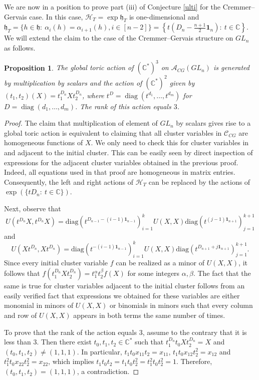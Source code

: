 \documentclass{amsart}
\newtheorem{proposition}[theorem]{Proposition}
\theoremstyle{definition}
\theoremstyle{remark}
\numberwithin{equation}{section}
\numberwithin{theorem}{section}
\begin{document}
 We are now in a position to prove part (iii) of Conjecture \ref{ulti} for the 
Cremmer--Gervais
case. In this case, ${\mathcal H}_T=\exp {\mathfrak h}_T$ is one-dimensional and ${\mathfrak h}_T=\{ h\in{\mathfrak h} {{:\ }} 
\alpha_i(h)=\alpha_{i+1}(h), i\in [n-2]\}=
\left \{ t \left ( D_n - \frac{n+1}{2}{\mathbf 1}_n\right ){{:\ }}  t\in\mathbb{C}\right \}$.
We will extend  the claim to the case of the  Cremmer--Gervais structure on
$GL_n$ as follows.

\begin{proposition}
\label{torus}
The global toric action of $(\mathbb{C}^*)^{3}$ on ${{\mathcal A}}_{CG}(GL_n)$ is generated by
multiplication by scalars and the action
of $(\mathbb{C}^*)^{2}$
given by $(t_1, t_2)(X) = t_1^{D_n} X t_2^{D_n}$, where 
$t^D={\operatorname{diag}}(t^{d_1},\dots,t^{d_m})$ for $D={\operatorname{diag}}(d_1,\dots,d_m)$. The rank of this action equals $3$.
\end{proposition}

\begin{proof} The claim that multiplication of element of $GL_n$ by scalars
gives rise to a global toric action is equivalent to claiming that all cluster
variables in 
${{\mathcal C}}_{CG}$ are homogeneous functions of $X$. We only need to check this for cluster
variables in and adjacent to the initial cluster. This can be easily seen by direct
inspection
of expressions for the adjacent cluster variables obtained in the previous proof.
Indeed, all equations used in that proof are homogeneous in matrix entries.
Consequently, the left and right actions of ${\mathcal H}_T$ can be replaced by the actions
of $\exp(\{tD_n{{:\ }} t\in{{\mathbb C}}\})$.

Next, observe that 
$$
U(t^{D_n} X, t^{D_n} X)=
\mbox{diag}(t^{D_{n-1} - (i-1){\mathbf 1}_{n-1}})_{i=1}^k U(X, X)
\mbox{diag}(t^{ (j-1){\mathbf 1}_{n+1}})_{j=1}^{k+1}
$$ 
and 
$$
U( X t^{D_n} , X t^{D_n})=
\mbox{diag}(t^{ - (i-1){\mathbf 1}_{n-1}})_{i=1}^k U(X, X)\mbox{diag}(t^{D_{n+1} +
j{\mathbf 1}_{n+1}})_{j=1}^{k+1}.
$$
Since every initial cluster variable $f$ can be realized as a minor of $U(X,X)$,
it follows
that $f(t_1^{D_n} X t_2^{D_n})=t_1^\alpha t_2^\beta f(X)$ for some integers $\alpha,
\beta$. The fact that the same is true for cluster variables adjacent to the initial
cluster
follows from an easily verified fact that expressions we obtained for these variables
are either monomial in minors of $U(X,X)$ or binomials in minors such that every column
and row of $U(X,X)$ appears in both terms the same number of times.

To prove that the rank of the action equals $3$, assume to the contrary that it is less than $3$.
Then there exist $t_0, t_1, t_2\in{{\mathbb C}}^*$ such that $t_1^{D_n}t_0Xt_2^{D_n}=X$ and 
$(t_0,t_1,t_2)\ne (1,1,1)$. In particular, $t_1t_0x_{11}t_2=x_{11}$, $t_1t_0x_{12}t_2^2=x_{12}$
and $t_1^2t_0x_{22}t_2^2=x_{22}$, which implies $t_1t_0t_2=t_1t_0t_2^2=t_1^2t_0t_2^2=1$. Therefore,
$(t_0,t_1,t_2)=(1,1,1)$, a contradiction.
\end{proof}
\end{document}
